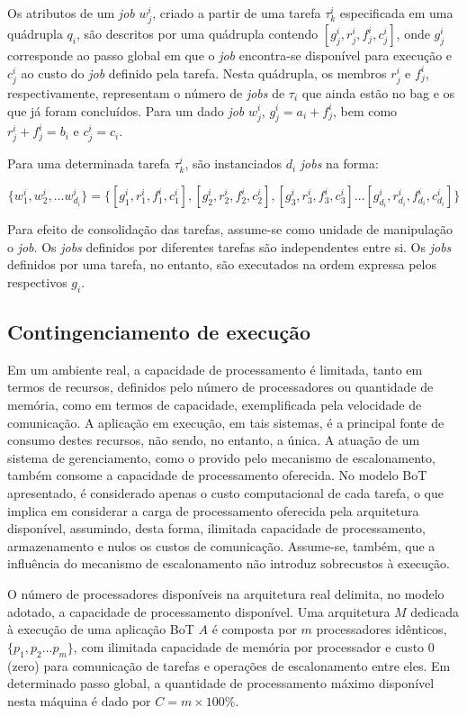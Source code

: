 \documentclass[tese,capa]{texufpel}
\begin{document}
Os atributos de um \textit{job} $w_j^i$, criado a partir de uma tarefa $\tau^i_k$ especificada em uma quádrupla $q_i$, são descritos por uma quádrupla contendo $[g_j^i,r_j^i,f_j^i,c_j^i]$, onde $g_j^i$ corresponde ao passo global em que o \textit{job} encontra-se disponível para execução e $c_j^i$ ao custo do \textit{job} definido pela tarefa. Nesta quádrupla, os membros $r_j^i$ e $f_j^i$, respectivamente, representam o número de \textit{jobs} de $\tau_i$ que ainda estão no bag e os que já foram concluídos. Para um dado \textit{job} $w_j^i$, $g_j^i = a_i+f_j^i$, bem como $r_j^i + f_j^i = b_i$ e $c_j^i = c_i$.

Para uma determinada tarefa $\tau^i_k$, são instanciados $d_i$ \textit{jobs} na forma: 

\[\{w_1^i, w_2^i, \dots w_{d_i}^i\} = \{[g_1^i,r_1^i,f_1^i,c_1^i],[g_2^i,r_2^i,f_2^i,c_2^i], [g_3^i,r_3^i,f_3^i,c_3^i] \dots [g_{d_i}^i,r_{d_i}^i,f_{d_i}^i,c_{d_i}^i]\}\]

Para efeito de consolidação das tarefas, assume-se como unidade de manipulação o \textit{job}. Os \textit{jobs} definidos por diferentes tarefas são independentes entre si. Os \textit{jobs} definidos por uma tarefa, no entanto, são executados na ordem expressa pelos respectivos $g_i$.

\subsection{Contingenciamento de execução}\label{subsec:contingenciamento_de_execucao}

Em um ambiente real, a capacidade de processamento é limitada, tanto em termos de recursos, definidos pelo número de processadores ou quantidade de memória, como em termos de capacidade, exemplificada pela velocidade de comunicação. A aplicação em execução, em tais sistemas, é a principal fonte de consumo destes recursos, não sendo, no entanto, a única. A atuação de um sistema de gerenciamento, como o provido pelo mecanismo de escalonamento, também consome a capacidade de processamento oferecida. No modelo BoT apresentado, é considerado apenas o custo computacional de cada tarefa, o que implica em considerar a carga de processamento oferecida pela arquitetura disponível, assumindo, desta forma, ilimitada capacidade de processamento, armazenamento e nulos os custos de comunicação. Assume-se, também, que a influência do mecanismo de escalonamento não introduz sobrecustos à execução.

O número de processadores disponíveis na arquitetura real delimita, no modelo adotado, a capacidade de processamento disponível. Uma arquitetura $M$ dedicada à execução de uma aplicação BoT $A$ é composta por $m$ processadores idênticos, $\{p_1, p_2 \dots p_m\}$, com ilimitada capacidade de memória por processador e custo 0 (zero) para comunicação de tarefas e operações de escalonamento entre eles. Em determinado passo global, a quantidade de processamento máximo disponível nesta máquina é dado por $C = m\times 100\%$.
\end{document}
